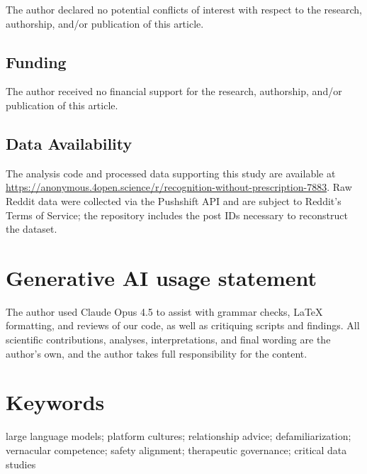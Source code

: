 \documentclass[12pt,a4paper]{article}
\begin{document}
The author declared no potential conflicts of interest with respect to the research, authorship, and/or publication of this article.

\subsection*{Funding}

The author received no financial support for the research, authorship, and/or publication of this article.

\subsection*{Data Availability}

The analysis code and processed data supporting this study are available at \url{https://anonymous.4open.science/r/recognition-without-prescription-7883}. Raw Reddit data were collected via the Pushshift API and are subject to Reddit's Terms of Service; the repository includes the post IDs necessary to reconstruct the dataset. 

\section*{Generative AI usage statement}

The author used Claude Opus 4.5 to assist with grammar checks, LaTeX formatting, and reviews of our code, as well as critiquing scripts and findings. All scientific contributions, analyses, interpretations, and final wording are the author's own, and the author takes full responsibility for the content.



\section*{Keywords}

large language models; platform cultures; relationship advice; defamiliarization; vernacular competence; safety alignment; therapeutic governance; critical data studies
\end{document}
